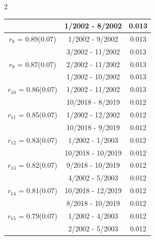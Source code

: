 \begin{multicols}{2}
{\begin{tabular}{ccc}
&        1/2002 -  8/2002 &        0.013  \vspace{-.02in} \\ \hline 
  $r_{ 8}$ = 0.89(0.07) &       1/2002 -  9/2002 &        0.013   \vspace{-.10in} \\  
&        3/2002 - 11/2002 &        0.013  \vspace{-.02in} \\ \hline 
  $r_{ 9}$ = 0.87(0.07) &       2/2002 - 11/2002 &        0.013   \vspace{-.10in} \\  
&        1/2002 - 10/2002 &        0.013  \vspace{-.02in} \\ \hline 
  $r_{10}$ = 0.86(0.07) &       1/2002 - 11/2002 &        0.013   \vspace{-.10in} \\  
&       10/2018 -  8/2019 &        0.012  \vspace{-.02in} \\ \hline 
  $r_{11}$ = 0.85(0.07) &       1/2002 - 12/2002 &        0.012   \vspace{-.10in} \\  
&       10/2018 -  9/2019 &        0.012  \vspace{-.02in} \\ \hline 
  $r_{12}$ = 0.83(0.07) &       1/2002 -  1/2003 &        0.012   \vspace{-.10in} \\  
&       10/2018 - 10/2019 &        0.012  \vspace{-.02in} \\ \hline 
  $r_{13}$ = 0.82(0.07) &       9/2018 - 10/2019 &        0.012   \vspace{-.10in} \\  
&        4/2002 -  5/2003 &        0.012  \vspace{-.02in} \\ \hline 
  $r_{14}$ = 0.81(0.07) &      10/2018 - 12/2019 &        0.012   \vspace{-.10in} \\  
&        8/2018 - 10/2019 &        0.012  \vspace{-.02in} \\ \hline 
  $r_{15}$ = 0.79(0.07) &       1/2002 -  4/2003 &        0.012   \vspace{-.10in} \\  
&        2/2002 -  5/2003 &        0.012  \vspace{-.02in} \\ \hline 

\end{tabular}}
\end{multicols}

